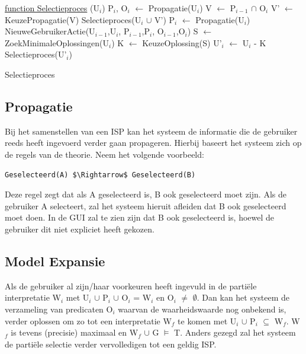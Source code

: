 \begin{algorithm}
	\underline{function Selectieproces} (U$_{i}$)\;
		{
		P$_{i}$, O$_{i}$ $\leftarrow$ Propagatie(U$_{i}$)\;
		V $\leftarrow$ P$_{i-1}$ $\cap$ O$_{i}$\;
			{
			V' $\leftarrow$ KeuzePropagatie(V)\; 
			Selectieproces(U$_{i}$ $\cup$ V')\;
			}
			{
			P$_{i}$ $\leftarrow$ Propagatie(U$_{i}$)\;	
			NieuweGebruikerActie(U$_{i-1}$,U$_{i}$,
			P$_{i-1}$,P$_{i}$,
			O$_{i-1}$,O$_{i}$)\;
			}
		}
		{
		S $\leftarrow$ ZoekMinimaleOplossingen(U$_{i}$)\; 
		K $\leftarrow$ KeuzeOplossing(S)\; 
		U'$_{i}$ $\leftarrow$ U$_{i}$ - K\; 
		Selectieproces(U'$_{i}$)\;
		}
	\caption{Selectieproces}
\end{algorithm}

\subsection{Propagatie}
Bij het samenstellen van een ISP kan het systeem de informatie die de gebruiker reeds heeft ingevoerd verder gaan propageren. Hierbij baseert het systeem zich op de regels van de theorie. Neem het volgende voorbeeld: 
\begin{lstlisting}[mathescape]
Geselecteerd(A) $\Rightarrow$ Geselecteerd(B)
\end{lstlisting}
Deze regel zegt dat als A geselecteerd is, B ook geselecteerd moet zijn. Als de gebruiker A selecteert, zal het systeem hieruit afleiden dat B ook geselecteerd moet doen. In de GUI zal te zien zijn dat B ook geselecteerd is, hoewel de gebruiker dit niet expliciet heeft gekozen.

\subsection{Model Expansie}
Als de gebruiker al zijn/haar voorkeuren heeft ingevuld in de parti\"{e}le interpretatie W$_{i}$ met U$_{i}$ $\cup$ P$_{i}$ $\cup$ O$_{i}$ = W$_{i}$ en O$_{i}$ $\neq$ $\emptyset$. Dan kan het systeem de verzameling van predicaten O$_{i}$ waarvan de waarheidswaarde nog onbekend is, verder oplossen om zo tot een interpretatie W$_{f}$ te komen met U$_{i}$ $\cup$ P$_{i}$ $\subseteq$ W$_{f}$. W$_{f}$ is tevens (precisie) maximaal en W$_{f}$ $\cup$ G $\models$ T. Anders gezegd zal het systeem de parti\"{e}le selectie verder vervolledigen tot een geldig ISP. 

